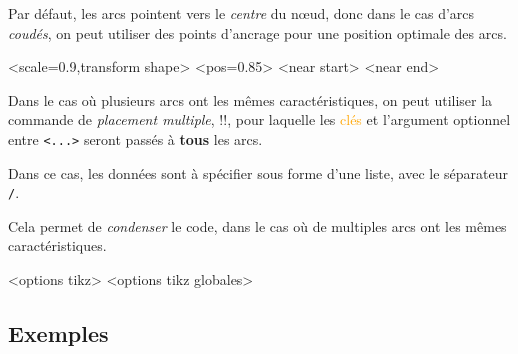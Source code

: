 \documentclass[french,a4paper,11pt]{article}
\newcommand\Cle[1]{{\small\sffamily\textlangle \textcolor{orange}{#1}\textrangle}}
\begin{document}
{{\begin{warningblock}
Par défaut, les arcs pointent vers le \textit{centre} du nœud, donc dans le cas d'arcs \textit{coudés}, on peut utiliser des points d'ancrage pour une position optimale des arcs.
\end{warningblock}

\pagebreak

\begin{DemoCode}[]
\begin{GrapheMPM}[LargeurCases=0.5cm]<scale=0.9,transform shape>
	<pos=0.85>
	<near start>
	<near end>
\end{GrapheMPM}
\end{DemoCode}

\begin{tipblock}
Dans le cas où plusieurs arcs ont les mêmes caractéristiques, on peut utiliser la commande de \textit{placement multiple}, \motcletex!\MPMPlaceDurees!, pour laquelle les \Cle{clés} et l'argument optionnel entre \texttt{<...>} seront passés à \textbf{tous} les arcs.

\smallskip

Dans ce cas, les données sont à spécifier sous forme d'une liste, avec le séparateur \texttt{/}.

\smallskip

Cela permet de \textit{condenser} le code, dans le cas où de multiples arcs ont les mêmes caractéristiques.
\end{tipblock}

\begin{DemoCode}
\begin{GrapheMPM}[clés]<options tikz>
		<options tikz globales>
\end{GrapheMPM}
\end{DemoCode}

\pagebreak

\subsection{Exemples}

}}
\end{document}
